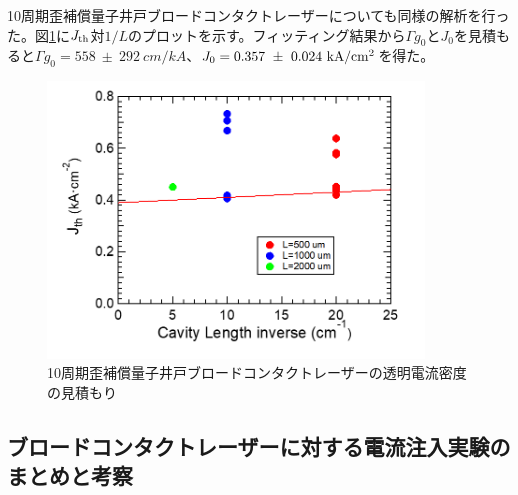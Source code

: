 {10周期歪補償量子井戸ブロードコンタクトレーザーについても同様の解析を行った。図\ref{fig:fig_3_1_10QW_broadcontact_j0}に$J_{\rm{th}}$対$1/L$のプロットを示す。フィッティング結果から$\Gamma g_{0}$と$J_{0}$を見積もると$\Gamma g_{0}=558\   \pm \ 292\  \si{cm/kA}$、$J_{0}=0.357\  \pm\  0.024\  \rm{kA/cm^{2}}$を得た。
\begin{figure}[t]
	\centering
	\includegraphics[width=10cm]{figure/fig_3_1_10QW_broadcontact_j0.png}
	\caption{10周期歪補償量子井戸ブロードコンタクトレーザーの透明電流密度の見積もり}
	\label{fig:fig_3_1_10QW_broadcontact_j0}
\end{figure}
\newpage
\subsection{ブロードコンタクトレーザーに対する電流注入実験のまとめと考察}

}
